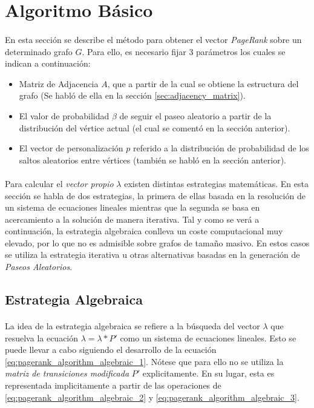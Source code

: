 \documentclass{subfiles}
\begin{document}
    \section{Algoritmo Básico}
    \label{sec:pagerank_algorithm}

      \paragraph{}
      En esta sección se describe el método para obtener el vector \emph{PageRank} sobre un determinado grafo $G$. Para ello, es necesario fijar 3 parámetros los cuales se indican a continuación:
      \begin{itemize}
        \item Matriz de Adjacencia $A$, que a partir de la cual se obtiene la estructura del grafo (Se habló de ella en la sección \ref{sec:adjacency_matrix}).
        \item El valor de probabilidad $\beta$ de seguir el paseo aleatorio a partir de la distribución del vértice actual (el cual se comentó en la sección anterior).
        \item El vector de personalización $p$ referido a la distribución de probabilidad de los saltos aleatorios entre vértices (también se habló en la sección anterior).
      \end{itemize}



      \paragraph{}
      Para calcular el \emph{vector propio} $\lambda$ existen distintas estrategias matemáticas. En esta sección se habla de dos estrategias, la primera de ellas basada en la resolución de un sistema de ecuaciones lineales mientras que la segunda se basa en acercamiento a la solución de manera iterativa. Tal y como se verá a continuación, la estrategia algebraica conlleva un coste computacional muy elevado, por lo que no es admisible sobre grafos de tamaño masivo. En estos casos se utiliza la estrategia iterativa u otras alternativas basadas en la generación de \emph{Paseos Aleatorios}.


      \subsection{Estrategia Algebraica}
      \label{sec:pagerank_algorithm_algebraic}

        \paragraph{}
        La idea de la estrategia algebraica se refiere a la búsqueda del vector $\lambda$ que resuelva la ecuación $\lambda = \lambda * P'$ como un sistema de ecuaciones lineales. Esto se puede llevar a cabo siguiendo el desarrollo de la ecuación \eqref{eq:pagerank_algorithm_algebraic_1}. Nótese que para ello no se utiliza la \emph{matriz de transiciones modificada} $P'$ explicitamente. En su lugar, esta es representada implicitamente a partir de las operaciones de \eqref{eq:pagerank_algorithm_algebraic_2} y \eqref{eq:pagerank_algorithm_algebraic_3}.
\end{document}
